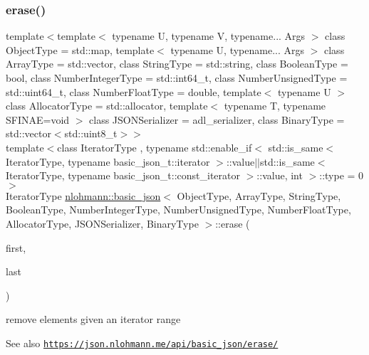 \subsubsection{\texorpdfstring{erase()}{erase()}\hspace{0.1cm}{\footnotesize\ttfamily [2/4]}}
{\footnotesize\ttfamily template$<$template$<$ typename U, typename V, typename... Args $>$ class Object\+Type = std\+::map, template$<$ typename U, typename... Args $>$ class Array\+Type = std\+::vector, class String\+Type  = std\+::string, class Boolean\+Type  = bool, class Number\+Integer\+Type  = std\+::int64\+\_\+t, class Number\+Unsigned\+Type  = std\+::uint64\+\_\+t, class Number\+Float\+Type  = double, template$<$ typename U $>$ class Allocator\+Type = std\+::allocator, template$<$ typename T, typename S\+F\+I\+N\+A\+E=void $>$ class J\+S\+O\+N\+Serializer = adl\+\_\+serializer, class Binary\+Type  = std\+::vector$<$std\+::uint8\+\_\+t$>$$>$ \\
template$<$class Iterator\+Type , typename std\+::enable\+\_\+if$<$ std\+::is\+\_\+same$<$ Iterator\+Type, typename basic\+\_\+json\+\_\+t\+::iterator $>$\+::value$\vert$$\vert$std\+::is\+\_\+same$<$ Iterator\+Type, typename basic\+\_\+json\+\_\+t\+::const\+\_\+iterator $>$\+::value, int $>$\+::type  = 0$>$ \\
Iterator\+Type \hyperlink{classnlohmann_1_1basic__json}{nlohmann\+::basic\+\_\+json}$<$ Object\+Type, Array\+Type, String\+Type, Boolean\+Type, Number\+Integer\+Type, Number\+Unsigned\+Type, Number\+Float\+Type, Allocator\+Type, J\+S\+O\+N\+Serializer, Binary\+Type $>$\+::erase (\begin{DoxyParamCaption}\item[{Iterator\+Type}]{first,  }\item[{Iterator\+Type}]{last }\end{DoxyParamCaption})\hspace{0.3cm}{\ttfamily [inline]}}



remove elements given an iterator range 

\begin{DoxySeeAlso}{See also}
\href{https://json.nlohmann.me/api/basic_json/erase/}{\tt https\+://json.\+nlohmann.\+me/api/basic\+\_\+json/erase/} 
\end{DoxySeeAlso}
\mbox{\label{classnlohmann_1_1basic__json_af72b1c9d1502b02a49a0cb9db9f980ea}} 
